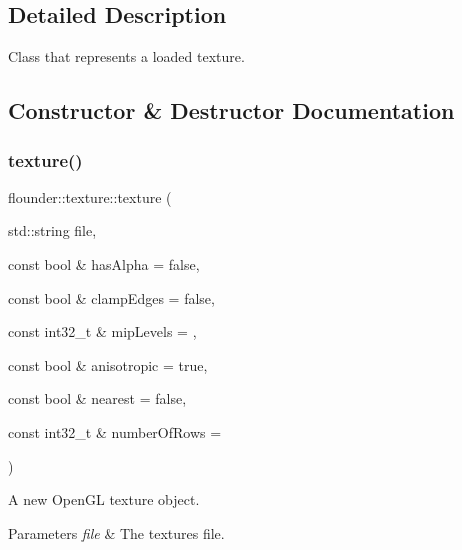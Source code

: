 \subsection{Detailed Description}
Class that represents a loaded texture. 



\subsection{Constructor \& Destructor Documentation}
\mbox{\label{classflounder_1_1texture_a62ac74067eac27177bb9b8e4483a7a55}} 
\subsubsection{\texorpdfstring{texture()}{texture()}\hspace{0.1cm}{\footnotesize\ttfamily [1/2]}}
{\footnotesize\ttfamily flounder\+::texture\+::texture (\begin{DoxyParamCaption}\item[{std\+::string}]{file,  }\item[{const bool \&}]{has\+Alpha = {\ttfamily false},  }\item[{const bool \&}]{clamp\+Edges = {\ttfamily false},  }\item[{const int32\+\_\+t \&}]{mip\+Levels = {},  }\item[{const bool \&}]{anisotropic = {\ttfamily true},  }\item[{const bool \&}]{nearest = {\ttfamily false},  }\item[{const int32\+\_\+t \&}]{number\+Of\+Rows = {} }\end{DoxyParamCaption})}



A new Open\+GL texture object. 


\begin{DoxyParams}{Parameters}
{\em file} & The textures file. \\
\hline
\end{DoxyParams}
\mbox{\label{classflounder_1_1texture_a907f7472caf155686539bd54fb451166}} 
